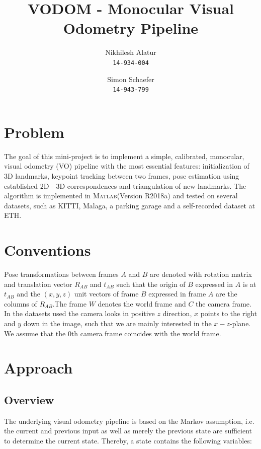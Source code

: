 \documentclass[letterpaper, 12 pt]{article}
\title{\Large \bf VODOM - Monocular Visual Odometry Pipeline}
\author{
  Nikhilesh Alatur\\\texttt{14-934-004}
  \and
  Simon Schaefer\\\texttt{14-943-799}
}
\date{\vspace{-3ex}}
\begin{document}
\maketitle

\begin{multicols*}{2}
\section{Problem}
The goal of this mini-project is to implement a simple, calibrated, monocular, visual odometry (VO) pipeline with the most essential features: initialization of 3D landmarks, keypoint tracking between two frames, pose estimation using established 2D - 3D correspondences and triangulation of new landmarks. The algorithm is implemented in \textsc{Matlab}(Version R2018a) and tested on several datasets, such as KITTI, Malaga, a parking garage and a self-recorded dataset at ETH. 

\section{Conventions}
Pose transformations between frames $A$ and $B$ are denoted with rotation matrix and translation vector $R_{AB}$ and $t_{AB}$ such that the origin of $B$ expressed in $A$ is at $t_{AB}$ and the $(x,y,z)$ unit vectors of frame $B$ expressed in frame $A$ are the columns of $R_{AB}$.The frame $W$ denotes the world frame and $C$ the camera frame. In the datasets used the camera looks in positive $z$ direction, $x$ points to the right and $y$ down in the image, such that we are mainly interested in the $x-z$-plane. We assume that the 0th camera frame coincides with the world frame.

\section{Approach}
\subsection{Overview}
The underlying visual odometry pipeline is based on the Markov assumption, i.e. the current and previous input as well as merely the previous state are sufficient to determine the current state. Thereby, a state contains the following variables: 


\end{multicols*}
\end{document}
